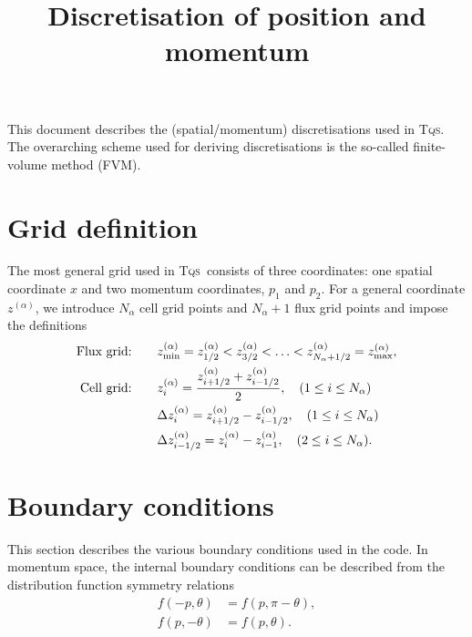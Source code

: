 \documentclass{notes}
\title{Discretisation of position and momentum}
\author{}
\newcommand{\TQS}{\textsc{Tqs}}
\begin{document}
    \maketitle

    \noindent
    This document describes the (spatial/momentum) discretisations used in \TQS.
    The overarching scheme used for deriving discretisations is the so-called
    finite-volume method (FVM).

    \tableofcontents

    \section{Grid definition}
    The most general grid used in \TQS\ consists of three coordinates: one
    spatial coordinate $x$ and two momentum coordinates, $p_1$ and $p_2$. For
    a general coordinate $z^{(\alpha)}$, we introduce $N_\alpha$ cell grid points and
    $N_\alpha+1$ flux grid points and impose the definitions
    \begin{equation}
        \begin{aligned}
            \text{Flux grid:} & \qquad z^{(\alpha)}_{\rm min} = z^{(\alpha)}_{1/2} < z^{(\alpha)}_{3/2} < \ldots < z^{(\alpha)}_{N_\alpha+1/2} = z^{(\alpha)}_{\rm max},\\
            \text{Cell grid:} & \qquad z^{(\alpha)}_i = \frac{z^{(\alpha)}_{i+1/2} + z^{(\alpha)}_{i-1/2}}{2}, \quad (1\leq i \leq N_\alpha)\\
            &\qquad \Delta z^{(\alpha)}_i = z^{(\alpha)}_{i+1/2} - z^{(\alpha)}_{i-1/2}, \quad (1\leq i \leq N_\alpha)\\
            &\qquad \Delta z^{(\alpha)}_{i-1/2} = z^{(\alpha)}_i - z^{(\alpha)}_{i-1},\quad (2\leq i \leq N_\alpha).
        \end{aligned}
    \end{equation}

    \section{Boundary conditions}
    This section describes the various boundary conditions used in the code.
    In momentum space, the internal boundary conditions can be described from
    the distribution function symmetry relations
    \begin{equation}\label{eq:fsymmetry}
        \begin{aligned}
            f(-p,\theta) &= f(p,\pi-\theta),\\
            f(p,-\theta) &= f(p,\theta).
        \end{aligned}
    \end{equation}
\end{document}
